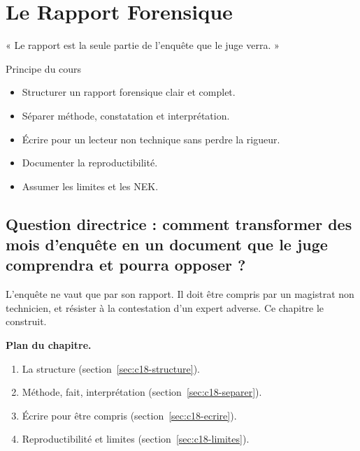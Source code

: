 
\chapter{Le Rapport Forensique}
\label{chap:rapport}

\epigraph{%
    « Le rapport est la seule partie de l'enquête que le juge verra. »%
}{Principe du cours}


\begin{boxobjectifs}
\begin{itemize}
    \item Structurer un rapport forensique clair et complet.
    \item Séparer méthode, constatation et interprétation.
    \item Écrire pour un lecteur non technique sans perdre la rigueur.
    \item Documenter la reproductibilité.
    \item Assumer les limites et les NEK.
\end{itemize}
\end{boxobjectifs}

\bigskip

\section*{Question directrice : comment transformer des mois d'enquête en un document que le juge comprendra et pourra opposer ?}

L'enquête ne vaut que par son rapport. Il doit être compris par un
magistrat non technicien, et résister à la contestation d'un expert adverse.
Ce chapitre le construit.

\medskip
\textbf{Plan du chapitre.}
\begin{enumerate}
    \item La structure (section~\ref{sec:c18-structure}).
    \item Méthode, fait, interprétation (section~\ref{sec:c18-separer}).
    \item Écrire pour être compris (section~\ref{sec:c18-ecrire}).
    \item Reproductibilité et limites (section~\ref{sec:c18-limites}).
\end{enumerate}

